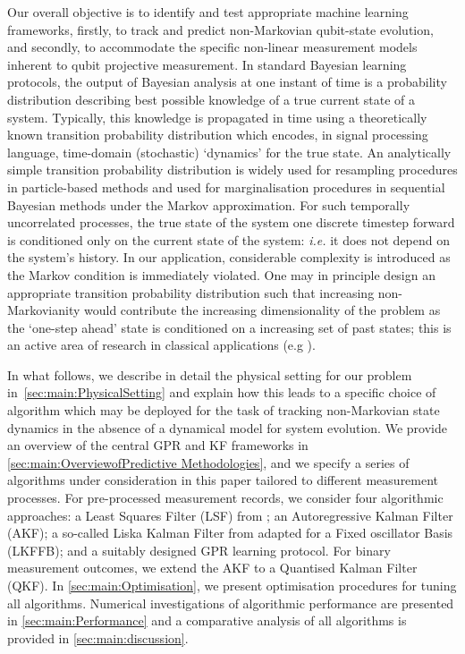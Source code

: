 Our overall objective is to identify and test appropriate machine learning frameworks, firstly, to track and predict non-Markovian qubit-state evolution, and secondly, to accommodate the specific non-linear measurement models inherent to qubit projective measurement. In standard Bayesian learning protocols, the output of Bayesian analysis at one instant of time is a probability distribution describing best possible knowledge of a true current state of a system. Typically, this knowledge is propagated in time using a theoretically known transition probability distribution which encodes, in signal processing language, time-domain (stochastic) `dynamics' for the true state. An analytically simple transition probability distribution is widely used for resampling procedures in particle-based methods and used for marginalisation procedures in sequential Bayesian methods \cite{candy2016bayesian} under the Markov approximation.  For such temporally uncorrelated processes, the true state of the system one discrete timestep forward is conditioned only on the current state of the system: \emph{i.e.} it does not depend on the system's history.   In our application, considerable complexity is introduced as the Markov condition is immediately violated. One may in principle design an appropriate transition probability distribution such that increasing non-Markovianity would contribute the increasing dimensionality of the problem as the `one-step ahead' state is conditioned on a increasing set of past states; this is an active area of research in classical applications (e.g  \cite{jacob2017bayesian}).  

In what follows, we describe in detail the physical setting for our problem in~\cref{sec:main:PhysicalSetting} and explain how this leads to a specific choice of algorithm which may be deployed for the task of tracking non-Markovian state dynamics in the absence of a dynamical model for system evolution.  We provide an overview of the central GPR and KF frameworks in \cref{sec:main:OverviewofPredictive Methodologies}, and we specify a series of algorithms under consideration in this paper tailored to different measurement processes. For pre-processed measurement records, we consider four algorithmic approaches: a Least Squares Filter (LSF) from \cite{mavadia2017}; an Autoregressive Kalman Filter (AKF); a so-called Liska Kalman Filter from \cite{livska2007} adapted for a Fixed oscillator Basis (LKFFB); and a suitably designed GPR learning protocol. For binary measurement outcomes, we extend the AKF to a Quantised Kalman Filter (QKF). In \cref{sec:main:Optimisation}, we present optimisation procedures for tuning all algorithms. Numerical investigations of algorithmic performance are presented in \cref{sec:main:Performance} and a comparative analysis of all algorithms is provided in \cref{sec:main:discussion}. 


